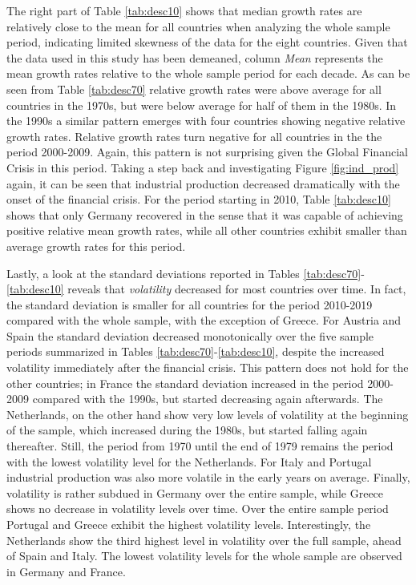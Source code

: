 \documentclass[12pt,letterpaper,fleqn]{article}           %
\begin{document}
The right part of Table \ref{tab:desc10} shows that median growth rates are relatively close to the mean for all countries when analyzing the whole sample period, indicating limited skewness of the data for the eight countries. Given that the data used in this study has been demeaned, column \textit{Mean} represents the mean growth rates relative to the whole sample period for each decade. As can be seen from Table \ref{tab:desc70} relative growth rates were above average for all countries in the 1970s, but were below average for half of them in the 1980s. In the 1990s a similar pattern emerges with four countries showing negative relative growth rates. Relative growth rates turn negative for all countries in the the period 2000-2009. Again, this pattern is not surprising given the Global Financial Crisis in this period. Taking a step back and investigating Figure \ref{fig:ind_prod} again, it can be seen that industrial production decreased dramatically with the onset of the financial crisis. For the period starting in 2010, Table \ref{tab:desc10} shows that only Germany recovered in the sense that it was capable of achieving positive relative mean growth rates, while all other countries exhibit smaller than average growth rates for this period.

Lastly, a look at the standard deviations reported in Tables \ref{tab:desc70}-\ref{tab:desc10} reveals that \textit{volatility} decreased for most countries over time. In fact, the standard deviation is smaller for all countries for the period 2010-2019 compared with the whole sample, with the exception of Greece. For Austria and Spain the standard deviation decreased monotonically over the five sample periods summarized in Tables \ref{tab:desc70}-\ref{tab:desc10}, despite the increased volatility immediately after the financial crisis. This pattern does not hold for the other countries; in France the standard deviation increased in the period 2000-2009 compared with the 1990s, but started decreasing again afterwards. The Netherlands, on the other hand show very low levels of volatility at the beginning of the sample, which increased during the 1980s, but started falling again thereafter. Still, the period from 1970 until the end of 1979 remains the period with the lowest volatility level for the Netherlands. For Italy and Portugal industrial production was also more volatile in the early years on average. Finally, volatility is rather subdued in Germany over the entire sample, while Greece shows no decrease in volatility levels over time. Over the entire sample period Portugal and Greece exhibit the highest volatility levels. Interestingly, the Netherlands show the third highest level in volatility over the full sample, ahead of Spain and Italy. The lowest volatility levels for the whole sample are observed in Germany and France.
\end{document}

